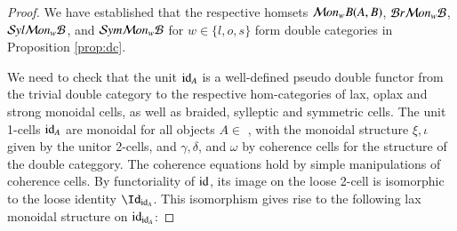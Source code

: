 \begin{proof}
We have established that the respective homsets $\mathcal{M} on_wB(A,B)$, $\mathcal{B} r \mathcal{M} on_w\mathcal{B}$, $\mathcal{S} yl \mathcal{M} on_w\mathcal{B}$, and $\mathcal{S} ym \mathcal{M} on_w\mathcal{B}$ for $w \in \{l,o,s\}$ form double categories in Proposition \ref{prop:dc}. 

We need to check that the unit $\mathrm{id}_A$ is a well-defined pseudo double functor from the trivial double category to the respective hom-categories of lax, oplax and strong monoidal cells, as well as braided, sylleptic and symmetric cells. 
The unit 1-cells $\mathrm{id}_A$ are monoidal for all objects $A \in$ \fB,  with the monoidal structure $\xi, \iota$ given by the unitor 2-cells, and $\gamma, \delta$, and $\omega$ by coherence cells for the structure of the double categgory. The coherence equations hold by simple manipulations of coherence cells. By functoriality of $\mathrm{id}$, its image on the loose 2-cell  is isomorphic to the loose identity $\looseid_{\transid_A}$. This isomorphism gives rise to the following lax monoidal structure on $\mathrm{id}_{\mathrm{id}_A}$: 


\end{proof}
